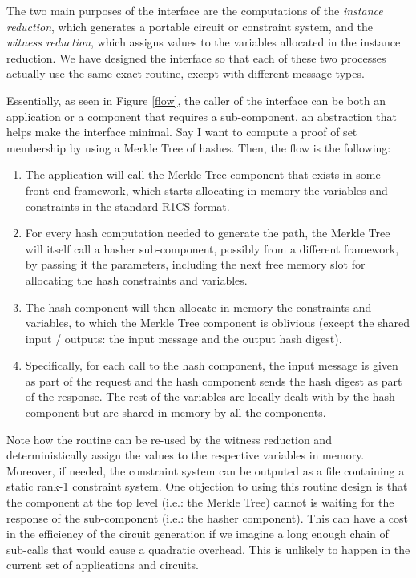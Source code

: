 The two main purposes of the interface are the computations of the \emph{instance reduction}, which generates a portable circuit or constraint system, and the \emph{witness reduction}, which assigns values to the variables allocated in the instance reduction. We have designed the interface so that each of these two processes actually use the same exact routine, except with different message types.

Essentially, as seen in Figure \ref{flow}, the caller of the interface can be both an application or a component that requires a sub-component, an abstraction that helps make the interface minimal. Say I want to compute a proof of set membership by using a Merkle Tree of hashes. Then, the flow is the following:
\begin{enumerate} 
	\item The application will call the Merkle Tree component that exists in some front-end framework, which starts allocating in memory the variables and constraints in the standard R1CS format.
	\item For every hash computation needed to generate the path, the Merkle Tree will itself call a hasher sub-component, possibly from a different framework, by passing it the parameters, including the next free memory slot for allocating the hash constraints and variables.
	\item The hash component will then allocate in memory the constraints and variables, to which the Merkle Tree component is oblivious (except the shared input / outputs: the input message and the output hash digest).
	\item Specifically, for each call to the hash component, the input message is given as part of the request and the hash component sends the hash digest as part of the response. The rest of the variables are locally dealt with by the hash component but are shared in memory by all the components.
\end{enumerate}

Note how the routine can be re-used by the witness reduction and deterministically assign the values to the respective variables in memory. Moreover, if needed, the constraint system can be outputed as a file containing a static rank-1 constraint system. One objection to using this routine design is that the component at the top level (i.e.: the Merkle Tree) cannot is waiting for the response of the sub-component (i.e.: the hasher component). This can have a cost in the efficiency of the circuit generation if we imagine a long enough chain of sub-calls that would cause a quadratic overhead. This is unlikely to happen in the current set of applications and circuits. 
	

